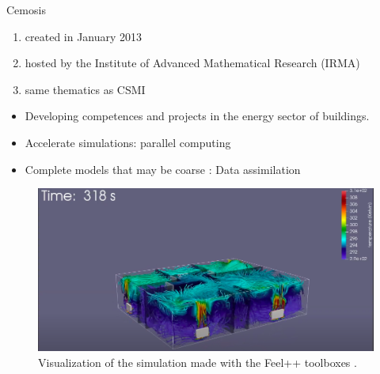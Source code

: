 \documentclass[10pt,xcolor={table,dvipsnames},t]{beamer}
\begin{document}
	\begin{frame}{Cemosis}
		
		\begin{minipage}{0.3\hsize}
			\centering
			\begin{enumerate}[$\rightarrow$]
				\item created in January 2013
				\item hosted by the Institute of Advanced Mathematical Research (IRMA)
				\item same thematics as CSMI
			\end{enumerate}
		\end{minipage} \quad
		\begin{minipage}{0.6\hsize}
			
     \begin{itemize}
        \item Developing
competences and projects in the energy sector of buildings.
\item Accelerate simulations: parallel computing
\item Complete models that may be coarse : Data assimilation
    \end{itemize}
    \begin{figure}
        \centering
        \includegraphics[width=0.65\linewidth]{"images/intro/cemosis_simulation_2.png"}
        \caption{Visualization of the simulation made with the Feel++ toolboxes  .}
    \end{figure}
		\end{minipage}
		
	
	\end{frame}
 
\end{document}
